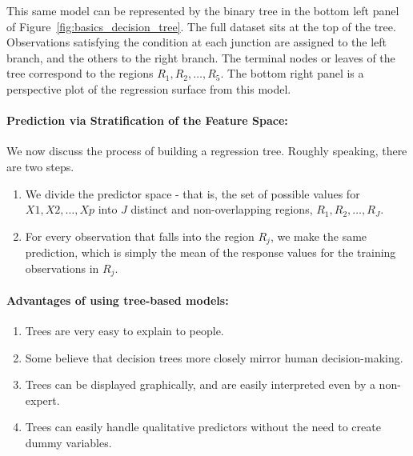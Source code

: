 This same model can be represented by the binary tree in the bottom left panel
of Figure~\ref{fig:basics_decision_tree}. The full dataset sits at the top of
the tree. Observations satisfying the condition at each junction are assigned to
the left branch, and the others to the right branch. The terminal nodes or
leaves of the tree correspond to the regions $R_1, R_2, \ldots, R_5$. The bottom
right panel is a perspective plot of the regression surface from this model.

\paragraph{Prediction via Stratification of the Feature Space:}

We now discuss the process of building a regression tree. Roughly speaking,
there are two steps.
\begin{enumerate}
    \item We divide the predictor space - that is, the set of possible values for
$X1, X2, \ldots, Xp$ into $J$ distinct and non-overlapping regions, $R_1, R_2,
\ldots, R_J$.
    \item For every observation that falls into the region $R_j$, we make the same
    prediction, which is simply the mean of the response values for the training
    observations in $R_j$.
\end{enumerate}

\paragraph{Advantages of using tree-based models:}

\begin{enumerate}
    \item Trees are very easy to explain to people.
    \item Some believe that decision trees more closely mirror human decision-making.
    \item Trees can be displayed graphically, and are easily interpreted even by a non-expert.
    \item Trees can easily handle qualitative predictors without the need to create dummy variables.
\end{enumerate}

